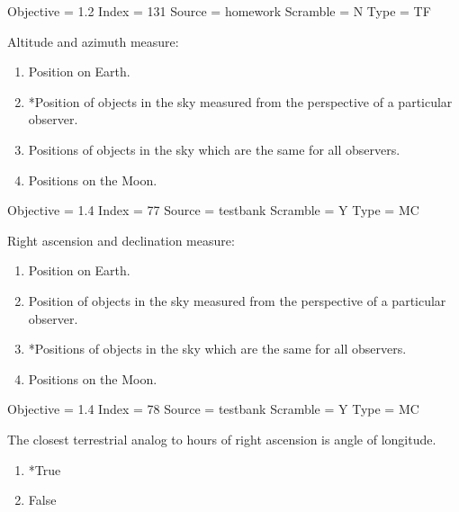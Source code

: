 \documentclass[11pt]{article}
\begin{document}
\begin{enumerate}
\begin{minipage}{\textwidth}
\begin{minipage}{\textwidth}
Objective = 1.2
Index = 131
Source = homework
Scramble = N
Type = TF
\end{minipage}
\end{minipage}
\vskip 0.20in

\begin{minipage}{\textwidth}
\begin{minipage}{\textwidth}
\item Altitude and azimuth measure:
\begin{enumerate} 
\setlength{\itemsep}{1pt} 
\setlength{\parskip}{0pt} 
\setlength{\parsep}{0pt}
\setlength{\multicolsep}{1pt} 
\item Position on Earth.
\item *Position of objects in the sky measured from the perspective of a particular observer.
\item Positions of objects in the sky which are the same for all observers.
\item Positions on the Moon.
\end{enumerate} 
Objective = 1.4
Index = 77
Source = testbank
Scramble = Y
Type = MC
\end{minipage}
\end{minipage}
\vskip 0.20in

\begin{minipage}{\textwidth}
\begin{minipage}{\textwidth}
\item Right ascension and declination measure:
\begin{enumerate} 
\setlength{\itemsep}{1pt} 
\setlength{\parskip}{0pt} 
\setlength{\parsep}{0pt}
\setlength{\multicolsep}{1pt} 
\item Position on Earth.
\item Position of objects in the sky measured from the perspective of a particular observer.
\item *Positions of objects in the sky which are the same for all observers.
\item Positions on the Moon.
\end{enumerate} 
Objective = 1.4
Index = 78
Source = testbank
Scramble = Y
Type = MC
\end{minipage}
\end{minipage}
\vskip 0.20in

\begin{minipage}{\textwidth}
\begin{minipage}{\textwidth}
\item The closest terrestrial analog to hours of right ascension is angle of longitude.
\begin{multicols}{3}
\begin{enumerate} 
\setlength{\itemsep}{1pt} 
\setlength{\parskip}{0pt} 
\setlength{\parsep}{0pt}
\setlength{\multicolsep}{1pt} 
\item *True
\item False
\end{enumerate} 
\vfill 
\end{multicols}


\end{minipage}
\end{minipage}
\end{enumerate}
\end{document}
